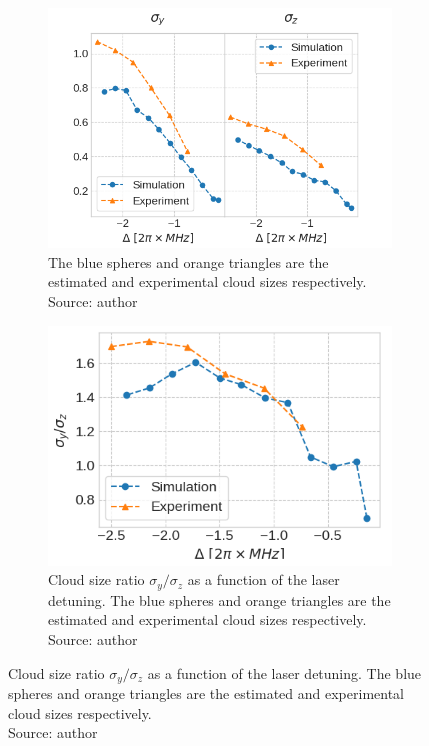 \begin{figure}[!ht]
    \centering
    \caption{Cloud sizes $ \sigma_y $ and $ \sigma_z $ of the Dreon nMOT as a function of the laser detuning}
    \begin{subfigure}[b]{0.5\linewidth}
        \centering
        \includegraphics[width=\textwidth]{USPSC-img/dy_cloud_size.png}
        \caption{The blue spheres and orange triangles are the estimated and experimental cloud sizes respectively.\\ Source: author}
        \label{fig:Dreon-cloud-size}
    \end{subfigure}
    \hfill
    \begin{subfigure}[b]{0.45\linewidth}
        \centering
        \includegraphics[width=\textwidth]{USPSC-img/dy_cloud_size_ratio.png}
        \caption{Cloud size ratio $ \sigma_y / \sigma_z $ as a function of the laser detuning. The blue spheres and orange triangles are the estimated and experimental cloud sizes respectively.\\ Source: author}
        \label{fig:Dreon-cloud-size-ratio}
    \end{subfigure}
\end{figure}

